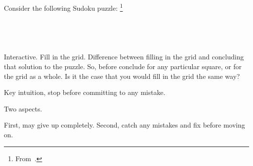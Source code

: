 \begin{note}
  \begin{illustration}[Sudoku]
    \label{illu:gist:sudoku}
    Consider the following Sudoku puzzle:%
    \footnote{
      From~\textcite[84]{Coussement:2007up}.
    }
    \vspace{\baselineskip}

    \mbox{ }\hfill%
    \begin{adjustbox}{minipage=0.45\linewidth,scale=1}
      \centering
    \end{adjustbox}%
    \hfill\mbox{ }

  \end{illustration}

  Interactive.
  Fill in the grid.
  Difference between filling in the grid and concluding that solution to the puzzle.
  So, before conclude for any particular square, or for the grid as a whole.
  Is it the case that you would fill in the grid the same way?

  Key intuition, stop before committing to any mistake.

  Two aspects.

  First, may give up completely.
  Second, catch any mistakes and fix before moving on.
\end{note}

